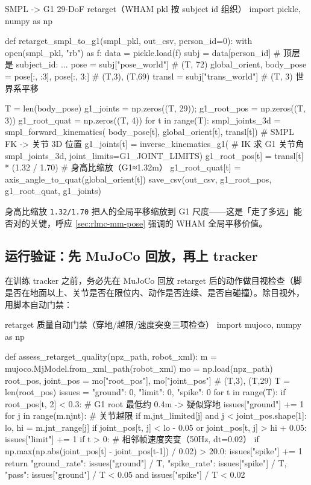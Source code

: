 \begin{codebox}[Python]{SMPL -> G1 29-DoF retarget（WHAM pkl 按 subject id 组织）}
import pickle, numpy as np

def retarget_smpl_to_g1(smpl_pkl, out_csv, person_id=0):
    with open(smpl_pkl, "rb") as f:
        data = pickle.load(f)
    subj = data[person_id]                  # 顶层是 {subject_id: {...}}
    pose = subj["pose_world"]               # (T, 72)
    global_orient, body_pose = pose[:, :3], pose[:, 3:]   # (T,3), (T,69)
    transl = subj["trans_world"]            # (T, 3) 世界系平移

    T = len(body_pose)
    g1_joints = np.zeros((T, 29)); g1_root_pos = np.zeros((T, 3))
    g1_root_quat = np.zeros((T, 4))
    for t in range(T):
        smpl_joints_3d = smpl_forward_kinematics(
            body_pose[t], global_orient[t], transl[t])    # SMPL FK -> 关节 3D 位置
        g1_joints[t] = inverse_kinematics_g1(             # IK 求 G1 关节角
            smpl_joints_3d, joint_limits=G1_JOINT_LIMITS)
        g1_root_pos[t] = transl[t] * (1.32 / 1.70)        # 身高比缩放（G1≈1.32m）
        g1_root_quat[t] = axis_angle_to_quat(global_orient[t])
    save_csv(out_csv, g1_root_pos, g1_root_quat, g1_joints)
\end{codebox}

身高比缩放 \verb|1.32/1.70| 把人的全局平移缩放到 G1 尺度——这是「走了多远」能否对的关键，呼应 \cref{sec:rlmc-mm-pose} 强调的 WHAM 全局平移价值。

\subsection{运行验证：先 MuJoCo 回放，再上 tracker}
\label{sec:rlmc-mm-video-verify}

在训练 tracker 之前，务必先在 MuJoCo 回放 retarget 后的动作做目视检查（脚是否在地面以上、关节是否在限位内、动作是否连续、是否自碰撞）。除目视外，用脚本自动门禁：

\begin{codebox}[Python]{retarget 质量自动门禁（穿地/越限/速度突变三项检查）}
import mujoco, numpy as np

def assess_retarget_quality(npz_path, robot_xml):
    m = mujoco.MjModel.from_xml_path(robot_xml)
    mo = np.load(npz_path)
    root_pos, joint_pos = mo["root_pos"], mo["joint_pos"]   # (T,3), (T,29)
    T = len(root_pos)
    issues = {"ground": 0, "limit": 0, "spike": 0}
    for t in range(T):
        if root_pos[t, 2] < 0.3:            # G1 root 最低约 0.4m -> 疑似穿地
            issues["ground"] += 1
        for j in range(m.njnt):             # 关节越限
            if m.jnt_limited[j] and j < joint_pos.shape[1]:
                lo, hi = m.jnt_range[j]
                if joint_pos[t, j] < lo - 0.05 or joint_pos[t, j] > hi + 0.05:
                    issues["limit"] += 1
        if t > 0:                           # 相邻帧速度突变（50Hz, dt=0.02）
            if np.max(np.abs(joint_pos[t] - joint_pos[t-1]) / 0.02) > 20.0:
                issues["spike"] += 1
    return {"ground_rate": issues["ground"] / T,
            "spike_rate": issues["spike"] / T,
            "pass": issues["ground"] / T < 0.05 and issues["spike"] / T < 0.02}
\end{codebox}

